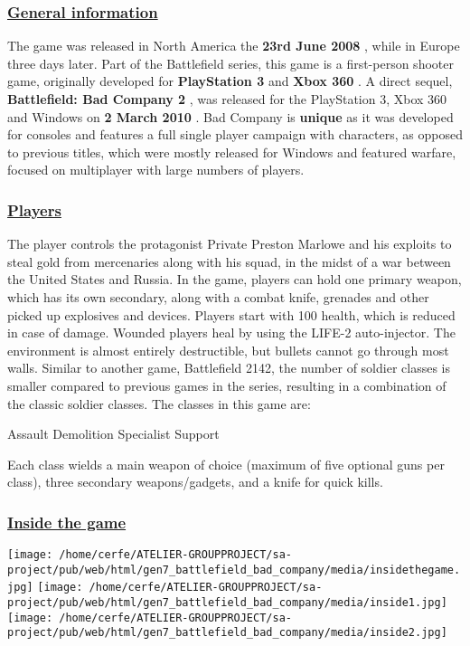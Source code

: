 \documentclass[a4paper,10pt]{book}
\begin{document}
 \subsubsection{\underline{General information }}
 
        The game was released in North America the  \textbf{23rd June 2008 } , while in Europe three days later. 
        Part of the Battlefield series, this game is a first-person shooter game, originally developed for  \textbf{PlayStation 3 }  and  \textbf{Xbox 360 } .  
        A direct sequel,  \textbf{Battlefield: Bad Company 2 } , was released for the PlayStation 3, Xbox 360 and Windows on  \textbf{2 March 2010 } .  
        Bad Company is  \textbf{unique }  as it was developed for consoles and features a full single player campaign
        with characters, as opposed to previous titles, which were mostly released for Windows and featured warfare, focused
        on multiplayer with large numbers of players.
       
 \subsubsection{\underline{Players }}
 
          The player controls the protagonist Private Preston Marlowe and his exploits to steal gold from mercenaries along with his squad, in
          the midst of a war between the United States and Russia.
          In the game, players can hold one primary weapon, which has its own secondary, along with a combat knife, grenades and other picked up explosives and devices.  
          Players start with 100 health, which is reduced in case of damage.  
          Wounded players heal by using the LIFE-2 auto-injector. 
          The environment is almost entirely destructible, but bullets cannot go through most walls.
          Similar to another game, Battlefield 2142, the number of soldier classes is smaller compared to previous games in the series, resulting in a combination of the classic soldier classes.  
          The classes in this game are:
         
 
 Assault 
 Demolition 
 Specialist 
 Support 
 
 
          Each class wields a main weapon of choice (maximum of five optional guns per class), three secondary weapons/gadgets, and a knife for quick kills.
         
 \subsubsection{\underline{Inside the game }}
 \texttt{[image: /home/cerfe/ATELIER-GROUPPROJECT/sa-project/pub/web/html/gen7\_battlefield\_bad\_company/media/insidethegame.jpg]}
 \texttt{[image: /home/cerfe/ATELIER-GROUPPROJECT/sa-project/pub/web/html/gen7\_battlefield\_bad\_company/media/inside1.jpg]}
 \texttt{[image: /home/cerfe/ATELIER-GROUPPROJECT/sa-project/pub/web/html/gen7\_battlefield\_bad\_company/media/inside2.jpg]}
\end{document}
